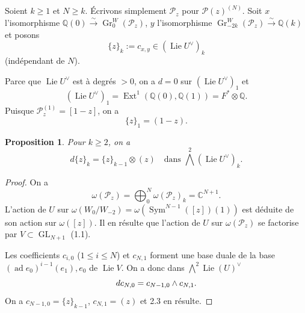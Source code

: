 \documentclass[12pt,a4paper]{article}
\theoremstyle{plain}
\newtheorem{proposition}{Proposition}[section]
\theoremstyle{definition}
\theoremstyle{remark}
\DeclareMathOperator{\Ext}{Ext}
\DeclareMathOperator{\Sym}{Sym}
\DeclareMathOperator{\Lie}{Lie}
\DeclareMathOperator{\ad}{ad}
\newcommand{\Q}{\mathbb{Q}}
\newcommand{\C}{\mathbb{C}}
\begin{document}
Soient $k\geq 1$ et $N\geq k$. {\'E}crivons simplement $\mathcal{P}_z$ pour $\mathcal{P}(z)^{(N)}$. Soit $x$ l'isomorphisme $\Q(0)\xrightarrow{\sim}\operatorname{Gr}^W_0(\mathcal{P}_z)$, $y$ l'isomorphisme $\operatorname{Gr}^W_{-2k}(\mathcal{P}_z)\xrightarrow{\sim}\Q(k)$ et posons
\begin{equation*}
\{z\}_k := c_{x,y}\in(\Lie U^\vee)_k
\end{equation*}
(ind{\'e}pendant de $N$).

Parce que $\Lie U^\vee$ est {\`a} degr{\'e}s $>0$, on a $d=0$ sur $(\Lie U^\vee)_1$ et
\begin{equation*}
(\Lie U^\vee)_1 = \Ext^1(\Q(0),\Q(1)) = F^*\otimes\Q.
\end{equation*}
Puisque $\mathcal{P}_z^{(1)}=[1-z]$, on a
\begin{equation*}
\{z\}_1 = (1-z).
\end{equation*}

\begin{proposition}
Pour $k\geq 2$, on a
\begin{equation*}
d\{z\}_k = \{z\}_{k-1}\otimes(z) \quad \text{dans }\bigwedge^2(\Lie U^\vee)_k.
\end{equation*}
\end{proposition}

\begin{proof}
On a
\begin{equation*}
\omega(\mathcal{P}_z) = \bigoplus_0^N\omega(\mathcal{P}_z)_k = \C^{N+1}.
\end{equation*}
L'action de $U$ sur $\omega(W_0/W_{-2})=\omega(\Sym^{N-1}([z])(1))$ est d{\'e}duite de son action sur $\omega([z])$. Il en r{\'e}sulte que l'action de $U$ sur $\omega(\mathcal{P}_z)$ se factorise par $V\subset\operatorname{GL}_{N+1}$ (1.1).

Les coefficients $c_{i,0}$ ($1\leq i\leq N$) et $c_{N,1}$ forment une base duale de la base $(\ad e_0)^{i-1}(e_1),e_0$ de $\Lie V$. On a donc dans $\bigwedge^2\Lie(U)^\vee$
\begin{equation*}
d c_{N,0} = c_{N-1,0}\wedge c_{N,1}.\qedhere
\end{equation*}
On a $c_{N-1,0}=\{z\}_{k-1}$, $c_{N,1}=(z)$ et 2.3 en r{\'e}sulte.
\end{proof}

\subsection{}
\end{document}
